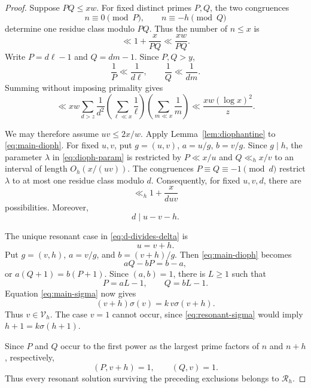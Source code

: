 \documentclass[11pt,reqno]{amsart}
\numberwithin{equation}{section}
\theoremstyle{plain}
\theoremstyle{definition}
\theoremstyle{remark}
\begin{document}
\begin{proof}
Suppose $PQ\le xw$. For fixed distinct primes $P,Q$, the two congruences
\[
n\equiv0\pmod P,\qquad n\equiv-h\pmod Q
\]
determine one residue class modulo $PQ$. Thus the number of $n\le x$ is
\[
\ll1+\frac{x}{PQ}\ll\frac{xw}{PQ}.
\]
Write $P=d\ell-1$ and $Q=dm-1$. Since $P,Q>y$,
\[
\frac1P\ll\frac1{d\ell},\qquad \frac1Q\ll\frac1{dm}.
\]
Summing without imposing primality gives
\begin{equation}\label{eq:large-d-PQ}
\ll xw\sum_{d>z}\frac1{d^2}
\left(\sum_{\ell\ll x}\frac1\ell\right)
\left(\sum_{m\ll x}\frac1m\right)
\ll\frac{xw(\log x)^2}{z}.
\end{equation}

We may therefore assume $uv\le2x/w$. Apply Lemma~\ref{lem:diophantine} to \eqref{eq:main-dioph}. For fixed $u,v$, put $g=(u,v)$, $a=u/g$, $b=v/g$. Since $g\mid h$, the parameter $\lambda$ in \eqref{eq:dioph-param} is restricted by $P\ll x/u$ and $Q\ll_h x/v$ to an interval of length $O_h(x/(uv))$. The congruences $P\equiv Q\equiv-1\pmod d$ restrict $\lambda$ to at most one residue class modulo $d$. Consequently, for fixed $u,v,d$, there are
\begin{equation}\label{eq:lambda-count}
\ll_h1+\frac{x}{duv}
\end{equation}
possibilities. Moreover,
\begin{equation}\label{eq:d-divides-delta}
d\mid u-v-h.
\end{equation}

The unique resonant case in \eqref{eq:d-divides-delta} is
\begin{equation}\label{eq:resonance}
u=v+h.
\end{equation}
Put $g=(v,h)$, $a=v/g$, and $b=(v+h)/g$. Then \eqref{eq:main-dioph} becomes
\[
aQ-bP=b-a,
\]
or $a(Q+1)=b(P+1)$. Since $(a,b)=1$, there is $L\ge1$ such that
\begin{equation}\label{eq:resonant-primes}
P=aL-1,\qquad Q=bL-1.
\end{equation}
Equation \eqref{eq:main-sigma} now gives
\begin{equation}\label{eq:resonant-sigma}
(v+h)\sigma(v)=k\,v\sigma(v+h).
\end{equation}
Thus $v\in\mathcal V_h$. The case $v=1$ cannot occur, since \eqref{eq:resonant-sigma} would imply $h+1=k\sigma(h+1)$.

Since $P$ and $Q$ occur to the first power as the largest prime factors of $n$ and $n+h$, respectively,
\[
(P,v+h)=1,\qquad (Q,v)=1.
\]
Thus every resonant solution surviving the preceding exclusions belongs to $\mathcal R_h$.


\end{proof}
\end{document}

